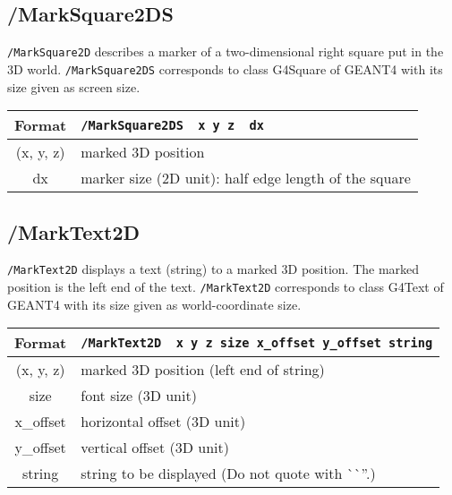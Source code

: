 \subsection{/MarkSquare2DS}  
\verb+/MarkSquare2D+ describes a marker of a two-dimensional right square  
put in the 3D world.
\verb+/MarkSquare2DS+ corresponds to class G4Square of GEANT4 with
its size given as screen size.
\vspace{.20in}

\begin{tabular}{|c|l|}
\hline%
Format     & \verb+/MarkSquare2DS  x y z  dx+\\
\hline%
(x, y, z)  &  marked 3D position  \\
\hline%
dx         &  marker size (2D unit): half edge length of the square \\
\hline%
\end{tabular}


\subsection{/MarkText2D}  
\verb+/MarkText2D+ displays a text (string) to a marked 3D position. 
The marked position is the left end of the text.
\verb+/MarkText2D+ corresponds to class G4Text of GEANT4 with
its size given as world-coordinate size.
\vspace{.20in}

\begin{tabular}{|c|l|}
\hline%
Format     & \verb+/MarkText2D  x y z size x_offset y_offset string+\\
\hline%
(x, y, z)  &  marked 3D position (left end of string) \\
\hline%
size       &  font size (3D unit) \\
\hline%
x\_offset   &  horizontal offset (3D unit) \\
\hline%
y\_offset   &  vertical   offset (3D unit) \\
\hline%
string     &  string to be displayed (Do not quote with ^^ ^^ ''.)\\
\hline%
\end{tabular}
\vspace{.20in}


